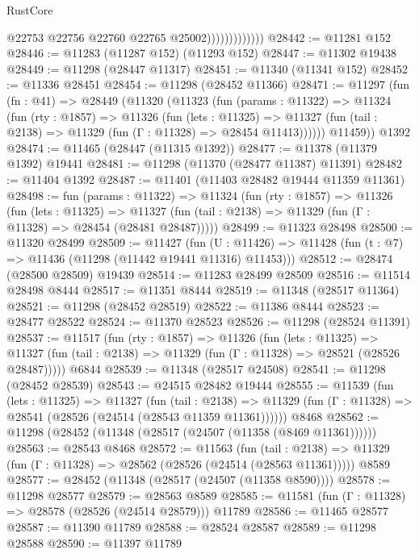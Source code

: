\begin{lexlean}{RustCore}
\begin{coremodule}
                              @22753
                              @22756
                              @22760
                              @22765
                              @25002)))))))))))))
@28442 := @11281 @152
@28446 := @11283 (@11287 @152) (@11293 @152)
@28447 := @11302 @19438
@28449 := @11298 (@28447 @11317)
@28451 := @11340 (@11341 @152)
@28452 := @11336 @28451
@28454 := @11298 (@28452 @11366)
@28471 := @11297
    (fun (fn : @41) =>
    @28449
      (@11320
        (@11323
          (fun (params : @11322) =>
          @11324
            (fun (rty : @1857) =>
            @11326
              (fun (lets : @11325) =>
              @11327 (fun (tail : @2138) => @11329 (fun (Γ : @11328) => @28454 @11413))))))
        @11459))
    @1392
@28474 := @11465 (@28447 (@11315 @1392))
@28477 := @11378 (@11379 @1392) @19441
@28481 := @11298 (@11370 (@28477 @11387) @11391)
@28482 := @11404 @1392
@28487 := @11401 (@11403 @28482 @19444 @11359 @11361)
@28498 := fun (params : @11322) =>
  @11324
    (fun (rty : @1857) =>
    @11326
      (fun (lets : @11325) =>
      @11327 (fun (tail : @2138) => @11329 (fun (Γ : @11328) => @28454 (@28481 @28487)))))
@28499 := @11323 @28498
@28500 := @11320 @28499
@28509 := @11427
    (fun (U : @11426) => @11428 (fun (t : @7) => @11436 (@11298 (@11442 @19441 @11316) @11453)))
@28512 := @28474 (@28500 @28509) @19439
@28514 := @11283 @28499 @28509
@28516 := @11514 @28498 @8444
@28517 := @11351 @8444
@28519 := @11348 (@28517 @11364)
@28521 := @11298 (@28452 @28519)
@28522 := @11386 @8444
@28523 := @28477 @28522
@28524 := @11370 @28523
@28526 := @11298 (@28524 @11391)
@28537 := @11517
    (fun (rty : @1857) =>
    @11326
      (fun (lets : @11325) =>
      @11327 (fun (tail : @2138) => @11329 (fun (Γ : @11328) => @28521 (@28526 @28487)))))
    @6844
@28539 := @11348 (@28517 @24508)
@28541 := @11298 (@28452 @28539)
@28543 := @24515 @28482 @19444
@28555 := @11539
    (fun (lets : @11325) =>
    @11327
      (fun (tail : @2138) =>
      @11329 (fun (Γ : @11328) => @28541 (@28526 (@24514 (@28543 @11359 @11361))))))
    @8468
@28562 := @11298 (@28452 (@11348 (@28517 (@24507 (@11358 (@8469 @11361))))))
@28563 := @28543 @8468
@28572 := @11563
    (fun (tail : @2138) => @11329 (fun (Γ : @11328) => @28562 (@28526 (@24514 (@28563 @11361)))))
    @8589
@28577 := @28452 (@11348 (@28517 (@24507 (@11358 @8590))))
@28578 := @11298 @28577
@28579 := @28563 @8589
@28585 := @11581 (fun (Γ : @11328) => @28578 (@28526 (@24514 @28579))) @11789
@28586 := @11465 @28577
@28587 := @11390 @11789
@28588 := @28524 @28587
@28589 := @11298 @28588
@28590 := @11397 @11789

\end{coremodule}
\end{lexlean}
